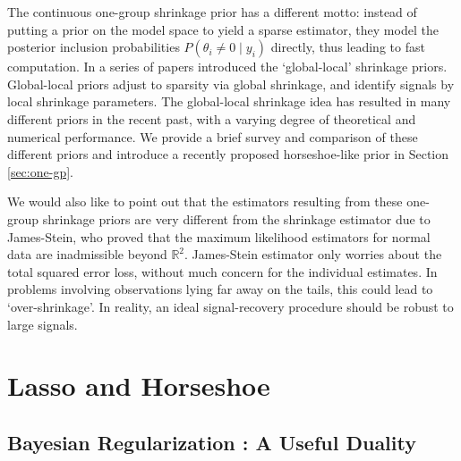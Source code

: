 \documentclass[11pt]{article}
\begin{document}
The continuous one-group shrinkage prior has a different motto: instead of putting a prior on the model space to yield a sparse estimator, they model the posterior inclusion probabilities $P(\theta_i \ne 0 \mid y_i)$ directly, thus leading to fast computation. In a series of papers \citet{carvalho2009handling, polson2010shrink, carvalho2010horseshoe, polson2012half} introduced the `global-local' shrinkage priors. Global-local priors adjust to sparsity via global shrinkage, and identify signals by local shrinkage parameters. The global-local shrinkage idea has resulted in many different priors in the recent past, with a varying degree of theoretical and numerical performance. We provide a brief survey and comparison of these different priors and introduce a recently proposed horseshoe-like prior in Section \ref{sec:one-gp}.   

We would also like to point out that the estimators resulting from these one-group shrinkage priors are very different from the shrinkage estimator due to James-Stein, who proved that the maximum likelihood estimators for normal data are inadmissible beyond $\mathbb{R}^2$. James-Stein estimator only worries about the total squared error loss, without much concern for the individual estimates. In problems involving observations lying far away on the tails, this could lead to `over-shrinkage'. In reality, an ideal signal-recovery procedure should be robust to large signals.


\section{Lasso and Horseshoe}
\subsection{Bayesian Regularization : A Useful Duality}
\end{document}
